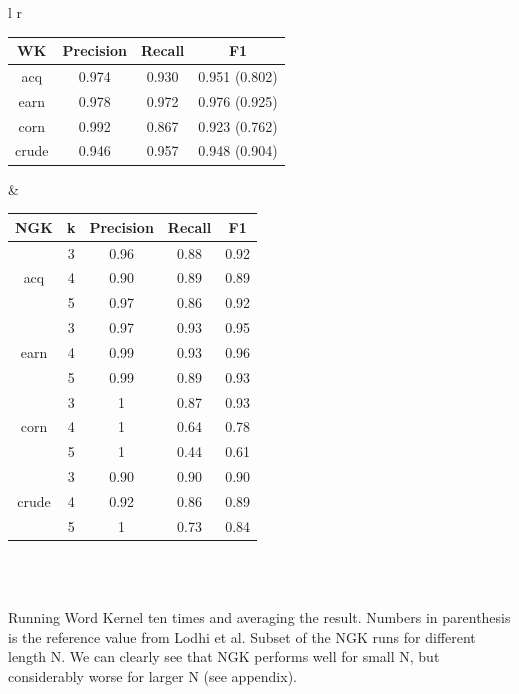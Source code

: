 
\begin{tabular}{l r}

			\begin{tabular}{| c | c | c | c | } \hline
		WK  & Precision & Recall & F1   \\ \hline	
		acq &  0.974  & 0.930  & 0.951 (0.802) \\ \hline
		earn &   0.978 & 0.972 & 0.976 (0.925)  \\ \hline
		corn &   0.992  & 0.867  &  0.923 (0.762) \\ \hline
		crude &   0.946  & 0.957  &  0.948 (0.904) \\ \hline	
	\end{tabular}
&
			\begin{tabular}{| c | c | c | c | c | } \hline
			NGK & k & Precision & Recall & F1   \\ \hline	
			& 3 & 0.96 & 0.88 & 0.92     \\ 
			acq & 4 & 0.90 & 0.89 &  0.89    \\
			& 5 & 0.97 & 0.86 & 0.92     \\ \hline
			& 3 & 0.97 & 0.93 &  0.95    \\ 
			earn & 4 & 0.99 & 0.93 &  0.96    \\ 
			& 5 & 0.99 & 0.89 &  0.93    \\ \hline
			& 3 & 1 & 0.87 & 0.93     \\ 
			corn & 4 & 1 & 0.64 & 0.78     \\ 
			& 5 & 1 & 0.44 &  0.61    \\ \hline
			& 3 & 0.90 & 0.90 &  0.90    \\ 
			crude & 4 & 0.92 & 0.86 & 0.89     \\ 
			& 5 & 1 & 0.73 &  0.84    \\ \hline
	\end{tabular}\\

\end{tabular}\\
	Running Word Kernel ten times and averaging the result. Numbers in parenthesis is the reference value from Lodhi et al.
Subset of the NGK runs for different length N. We can clearly see that NGK performs well for small N, but considerably worse for larger N (see appendix).\\
